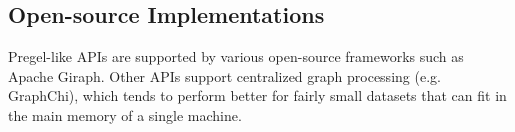 \documentclass[12pt,titlepage]{article}
\begin{document}
    \subsection{Open-source Implementations}
      Pregel-like APIs are supported by various open-source frameworks such as Apache Giraph. Other APIs support centralized graph processing (e.g. GraphChi), which
      tends to perform better for fairly small datasets that can fit in the main memory of a single machine.
\end{document}
